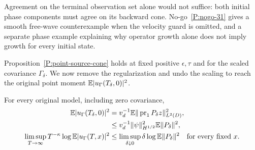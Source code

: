 Agreement on the terminal observation set alone would not suffice:
both initial phase components must agree on its backward cone.
No-go~\ref{P:nogo-31} gives a smooth free-wave counterexample when
the velocity guard is omitted, and a separate phase example explaining
why operator growth alone does not imply growth for every initial state.


Proposition~\ref{P:point-source-cone} holds at fixed positive
$\epsilon,\tau$ and for the scaled covariance $\Gamma_\delta$. We now remove the
regularization and undo the scaling to reach the original point moment
$\mathbb{E}|u_\Gamma(T_\delta,0)|^2$.

\begin{proposition}
  \label{P:original-point-transfer}
  For every original model, including zero covariance,
  \begin{align}
    \mathbb{E}|u_\Gamma(T_\delta,0)|^2
    &=v_d^{-1}\mathbb{E}\|\operatorname{pr}_1P_\delta z\|_{L^2(D)}^2,
    \label{E:original-point-transfer}\\
    &\le v_d^{-1}\|\psi\|_{H^{1/2}}^2\mathbb{E}\|P_\delta\|^2,\notag\\
    \limsup_{T\to\infty}T^{-\kappa}\log\mathbb{E}|u_\Gamma(T,x)|^2
    &\le\limsup_{\delta\downarrow0}\delta\log\mathbb{E}\|P_\delta\|^2
    \quad\hbox{for every fixed }x .
    \label{E:original-point-rate-reduction}
  \end{align}
\end{proposition}

